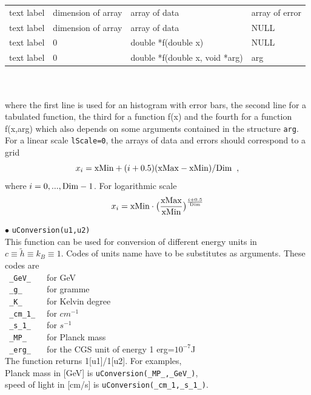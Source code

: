 \documentclass[12pt,a4paper]{article}
\begin{document}
\begin{tabular}{|l|l|l|l|}
\hline
   text label &  dimension  of array     &  array of data               & array of error     \\            
   text label   &      dimension of array            &  array of data               &  NULL              \\  
  text label    &   0             & double *f(double x)  &  NULL              \\                 
   text label    &       0         & double *f(double x, void *arg)&  arg       \\
\hline    
\end{tabular}\\
\\
where the first line is used for an histogram with error bars, the second line for a tabulated function, the third for a function f(x) and the fourth for a function f(x,arg) which also depends on some arguments contained in the structure \verb|arg|.
 For a linear scale  {\tt lScale=0}, the arrays of data  and errors  should correspond to a grid
$$x_i={\rm xMin}+(i+0.5)({\rm xMax}- {\rm xMin})/{\rm Dim}\;\;,$$ 
where $i=0,...,{\rm Dim}-1$. For logarithmic scale  
   $$x_i={\rm xMin}\cdot \big(\frac{{\rm xMax}}{{\rm xMin}}\big)^\frac{i+0.5}{{\rm Dim}}$$

\noindent
$\bullet$ \verb|uConversion(u1,u2)|\\
This function can be used for conversion of different energy units in  $c\equiv \tilde{h}\equiv k_B   \equiv 1 $. Codes of units name have to be
substitutes as arguments. These codes are\\ 
\verb| _GeV_   |    for GeV   \\       
\verb| _g_     |    for gramme\\
\verb| _K_     |    for Kelvin  degree\\
\verb| _cm_1_  |    for $cm^{-1}$\\
\verb| _s_1_   |    for $s^{-1}$ \\
\verb| _MP_    |    for Planck mass\\
\verb| _erg_   |    for the CGS unit of energy 1 erg=$10^{-7}$J   \\
The function returns 1[u1]/1[u2]. For examples, \\
  Planck mass in [GeV] is \verb|uConversion(_MP_,_GeV_)|,\\
  speed of light in [cm/s]  is \verb|uConversion(_cm_1,_s_1_)|.  

  
\end{document}
